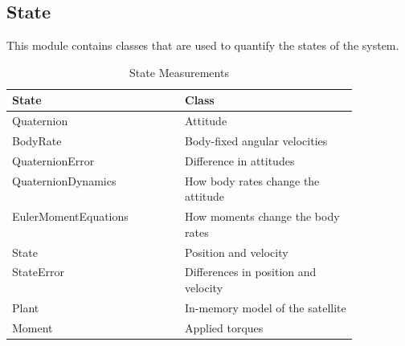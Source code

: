\subsection{State}
\label{subsec:State}

This module contains classes that are used to quantify the states of the system.

\begin{table}[H]
  \centering
  \begin{tabular}{l|p{0.5\linewidth}}
State  & Class \\ \hline
Quaternion & Attitude \\
BodyRate & Body-fixed angular velocities \\
QuaternionError & Difference in attitudes \\
QuaternionDynamics & How body rates change the attitude \\
EulerMomentEquations & How moments change the body rates  \\
State & Position and velocity \\
StateError & Differences in position and velocity \\
Plant & In-memory model of the satellite \\
Moment & Applied torques \\
  \end{tabular}
  \caption{State Measurements}
  \label{tbl:State}
\end{table}

